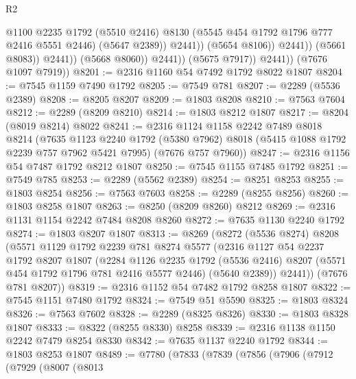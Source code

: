 \begin{lexlean}{R2}
\begin{coremodule}
                                    @1100
                                    @2235
                                    @1792
                                    (@5510 @2416)
                                    @8130
                                    (@5545 @454 @1792 @1796 @777 @2416 @5551 @2446)
                                    (@5647 @2389))
                                  @2441))
                              (@5654 @8106))
                            @2441))
                        (@5661 @8083))
                      @2441))
                  (@5668 @8060))
                @2441))
            (@5675 @7917))
          @2441))
      (@7676 @1097 @7919))
@8201 := @2316 @1160 @54 @7492 @1792 @8022 @1807
@8204 := @7545 @1159 @7490 @1792
@8205 := @7549 @781
@8207 := @2289 (@5536 @2389)
@8208 := @8205 @8207
@8209 := @1803 @8208
@8210 := @7563 @7604
@8212 := @2289 (@8209 @8210)
@8214 := @1803 @8212 @1807
@8217 := @8204 (@8019 @8214) @8022
@8241 := @2316
    @1124
    @1158
    @2242
    @7489
    @8018
    @8214
    (@7635
      @1123
      @2240
      @1792
      (@5380 @7962)
      @8018
      (@5415 @1088 @1792 @2239 @757 @7962 @5421 @7995)
      (@7676 @757 @7960))
@8247 := @2316 @1156 @54 @7487 @1792 @8212 @1807
@8250 := @7545 @1155 @7485 @1792
@8251 := @7549 @785
@8253 := @2289 (@5562 @2389)
@8254 := @8251 @8253
@8255 := @1803 @8254
@8256 := @7563 @7603
@8258 := @2289 (@8255 @8256)
@8260 := @1803 @8258 @1807
@8263 := @8250 (@8209 @8260) @8212
@8269 := @2316 @1131 @1154 @2242 @7484 @8208 @8260
@8272 := @7635 @1130 @2240 @1792
@8274 := @1803 @8207 @1807
@8313 := @8269
    (@8272
      (@5536 @8274)
      @8208
      (@5571
        @1129
        @1792
        @2239
        @781
        @8274
        @5577
        (@2316
          @1127
          @54
          @2237
          @1792
          @8207
          @1807
          (@2284
            @1126
            @2235
            @1792
            (@5536 @2416)
            @8207
            (@5571 @454 @1792 @1796 @781 @2416 @5577 @2446)
            (@5640 @2389))
          @2441))
      (@7676 @781 @8207))
@8319 := @2316 @1152 @54 @7482 @1792 @8258 @1807
@8322 := @7545 @1151 @7480 @1792
@8324 := @7549 @51 @5590
@8325 := @1803 @8324
@8326 := @7563 @7602
@8328 := @2289 (@8325 @8326)
@8330 := @1803 @8328 @1807
@8333 := @8322 (@8255 @8330) @8258
@8339 := @2316 @1138 @1150 @2242 @7479 @8254 @8330
@8342 := @7635 @1137 @2240 @1792
@8344 := @1803 @8253 @1807
@8489 := @7780
    (@7833
      (@7839
        (@7856
          (@7906
            (@7912
              (@7929
                (@8007
                  (@8013

\end{coremodule}
\end{lexlean}
